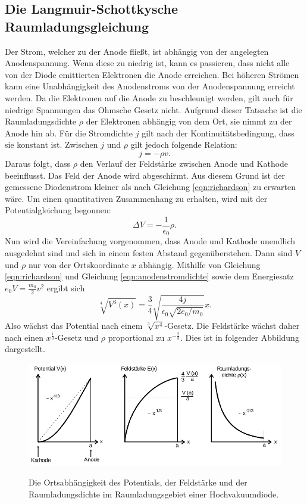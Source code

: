 \subsection{Die Langmuir-Schottkysche Raumladungsgleichung}
\label{sec:langmuirschottky}
Der Strom, welcher zu der Anode fließt, ist abhängig von der angelegten
Anodenspannung. Wenn diese zu niedrig ist, kann es passieren, dass nicht alle
von der Diode emittierten Elektronen die Anode erreichen. Bei höheren Strömen
kann eine Unabhängigkeit des Anodenstroms von der Anodenspannung erreicht werden.
Da die Elektronen auf die Anode zu beschleunigt werden, gilt auch für niedrige
Spannungen das Ohmsche Gesetz nicht. Aufgrund dieser Tatsache ist die
Raumladungsdichte $\rho$ der Elektronen abhängig von dem Ort, sie nimmt zu der
Anode hin ab. Für die Stromdichte $j$ gilt nach der Kontinuitätsbedingung, dass
sie konstant ist. Zwischen $j$ und $\rho$ gilt jedoch folgende Relation:
\begin{equation}
  j = -\rho v.
  \label{eqn:anodenstromdichte}
\end{equation}
Daraus folgt, dass $\rho$ den Verlauf der Feldstärke zwischen Anode und Kathode
beeinflusst. Das Feld der Anode wird abgeschirmt. Aus diesem Grund ist der
gemessene Diodenstrom kleiner als nach Gleichung \eqref{eqn:richardson} zu
erwarten wäre.
Um einen quantitativen Zusammenhang zu erhalten, wird mit der Potentialgleichung
begonnen:
\begin{equation}
  \Delta V = -\frac{1}{\epsilon_0} \rho.
  \label{eqn:Potentialgleichung}
\end{equation}
Nun wird die Vereinfachung vorgenommen, dass Anode und Kathode unendlich ausgedehnt
sind und sich in einem festen Abstand gegenüberstehen. Dann sind $V$ und $\rho$
nur von der Ortskoordinate $x$ abhängig. Mithilfe von Gleichung
\eqref{eqn:richardson} und Gleichung \eqref{eqn:anodenstromdichte} sowie dem
Energiesatz $e_0 V = \frac{m_0}{2} v^2$ ergibt sich
\begin{equation}
  \sqrt[4]{V^3(x)} = \frac{3}{4} \sqrt{\frac{4 j}{\epsilon_0 \sqrt{2 e_0/m_0}}}x.
  \label{eqn:gleichung11}
\end{equation}
Also wächst das Potential nach einem $\sqrt[3]{x^4}$-Gesetz. Die Feldstärke
wächst daher nach einen $x^{\frac{1}{3}}$-Gesetz und $\rho$ proportional zu
$x^{-\frac{2}{3}}$. Dies ist in folgender Abbildung dargestellt.
\begin{figure}[H]
  \centering
  \includegraphics[scale=0.5]{content/langmuirschottky.png}
  \label{fig:langmuirschottky1}
  \caption{Die Ortsabhängigkeit des Potentials, der Feldstärke und der
  Raumladungsdichte im Raumladungsgebiet einer Hochvakuumdiode.}
\end{figure}
